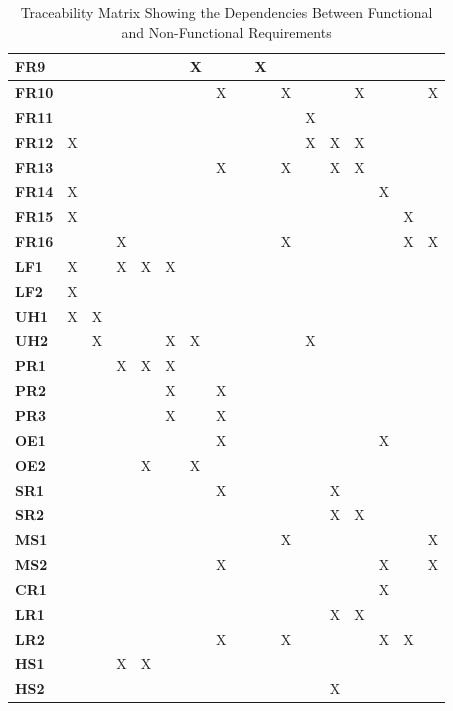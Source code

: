 \documentclass[12pt]{article}
\begin{document}
{\begin{landscape}
\begin{table}[h!]
\begin{tabular}{|p{1cm}|p{0.9cm}|p{0.9cm}|p{0.9cm}|p{0.9cm}|p{0.9cm}|p{0.9cm}|p{0.9cm}|p{0.9cm}|p{0.9cm}|p{0.9cm}|p{0.9cm}|p{0.9cm}|p{0.9cm}|p{0.9cm}|p{0.9cm}|p{0.9cm}|}
\hline
\textbf{FR9} & & & & & & X & & & X & & & & & & & \\ 
\hline
\textbf{FR10} & & & & & & & X & & & X & & & X & & & X \\ 
\hline
\textbf{FR11} & & & & & & & & & & & X & & & & & \\ 
\hline
\textbf{FR12} & X & & & & & & & & & & X & X & X & & & \\ 
\hline
\textbf{FR13} & & & & & & & X & & & X & & X & X & & & \\ 
\hline
\textbf{FR14} & X & & & & & & & & & & & & & X & & \\ 
\hline
\textbf{FR15} & X & & & & & & & & & & & & & & X & \\ 
\hline
\textbf{FR16} & & & X & & & & & & & X & & & & & X & X \\ 
\hline
\textbf{LF1} & X & & X & X & X & & & & & & & & & & & \\ 
\hline
\textbf{LF2} & X & & & & & & & & & & & & & & & \\ 
\hline
\textbf{UH1} & X & X & & & & & & & & & & & & & & \\ 
\hline
\textbf{UH2} & & X & & & X & X & & & & & X & & & & & \\ 
\hline
\textbf{PR1} & & & X & X & X & & & & & & & & & & & \\ 
\hline
\textbf{PR2} & & & & & X & & X & & & & & & & & & \\ 
\hline
\textbf{PR3} & & & & & X & & X & & & & & & & & & \\ 
\hline
\textbf{OE1} & & & & & & & X & & & & & & & X & & \\ 
\hline
\textbf{OE2} & & & & X & & X & & & & & & & & & & \\ 
\hline
\textbf{SR1} & & & & & & & X & & & & & X & & & & \\ 
\hline
\textbf{SR2} & & & & & & & & & & & & X & X & & & \\ 
\hline
\textbf{MS1} & & & & & & & & & & X & & & & & & X \\ 
\hline
\textbf{MS2} & & & & & & & X & & & & & & & X & & X \\ 
\hline
\textbf{CR1} & & & & & & & & & & & & & & X & & \\ 
\hline
\textbf{LR1} & & & & & & & & & & & & X & X & & & \\ 
\hline
\textbf{LR2} & & & & & & & X & & & X & & & & X & X & \\ 
\hline
\textbf{HS1} & & & X & X & & & & & & & & & & & & \\ 
\hline
\textbf{HS2} & & & & & & & & & & & & X & & & & \\ 
\hline
\end{tabular}
\caption{Traceability Matrix Showing the Dependencies Between Functional and Non-Functional Requirements}
\label{Table:Traceability}
\end{table}
\end{landscape}
}
\newpage{}
\end{document}
